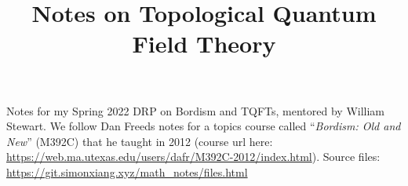 \documentclass[fontsize=9pt]{article}
\title{Notes on Topological Quantum Field Theory}
\begin{document}
\maketitle
Notes for my Spring 2022 DRP on Bordism and TQFTs, mentored by William Stewart. We follow Dan Freeds notes for a topics course called ``\emph{Bordism: Old and New}'' (M392C) that he taught in 2012 (course url here: \url{https://web.ma.utexas.edu/users/dafr/M392C-2012/index.html}). Source files: \url{https://git.simonxiang.xyz/math_notes/files.html}

\tableofcontents
\newpage
    
\end{document}
